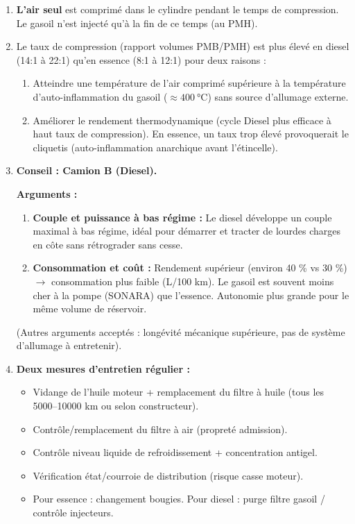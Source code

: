 \documentclass[11pt]{article}
\begin{document}
\begin{corrige}
\begin{enumerate}
\item \textbf{L'air seul} est comprimé dans le cylindre pendant le temps de compression. Le gasoil n'est injecté qu'à la fin de ce temps (au PMH).
\item Le taux de compression (rapport volumes PMB/PMH) est plus élevé en diesel (14:1 à 22:1) qu'en essence (8:1 à 12:1) pour deux raisons :
      \begin{enumerate}
      \item Atteindre une température de l'air comprimé supérieure à la température d'auto-inflammation du gasoil ($\approx \SI{400}{\celsius}$) sans source d'allumage externe.
      \item Améliorer le rendement thermodynamique (cycle Diesel plus efficace à haut taux de compression). En essence, un taux trop élevé provoquerait le cliquetis (auto-inflammation anarchique avant l'étincelle).
      \end{enumerate}
\item \textbf{Conseil : Camion B (Diesel).}
      \par \textbf{Arguments :}
      \begin{enumerate}
      \item \textbf{Couple et puissance à bas régime :} Le diesel développe un couple maximal à bas régime, idéal pour démarrer et tracter de lourdes charges en côte sans rétrograder sans cesse.
      \item \textbf{Consommation et coût :} Rendement supérieur (environ 40 \% vs 30 \%) $\rightarrow$ consommation plus faible (L/100 km). Le gasoil est souvent moins cher à la pompe (SONARA) que l'essence. Autonomie plus grande pour le même volume de réservoir.
      \end{enumerate}
      (Autres arguments acceptés : longévité mécanique supérieure, pas de système d'allumage à entretenir).
\item \textbf{Deux mesures d'entretien régulier :}
      \begin{itemize}
      \item Vidange de l'huile moteur + remplacement du filtre à huile (tous les 5000--10000 km ou selon constructeur).
      \item Contrôle/remplacement du filtre à air (propreté admission).
      \item Contrôle niveau liquide de refroidissement + concentration antigel.
      \item Vérification état/courroie de distribution (risque casse moteur).
      \item Pour essence : changement bougies. Pour diesel : purge filtre gasoil / contrôle injecteurs.

\end{itemize}
\end{enumerate}
\end{corrige}
\end{document}
